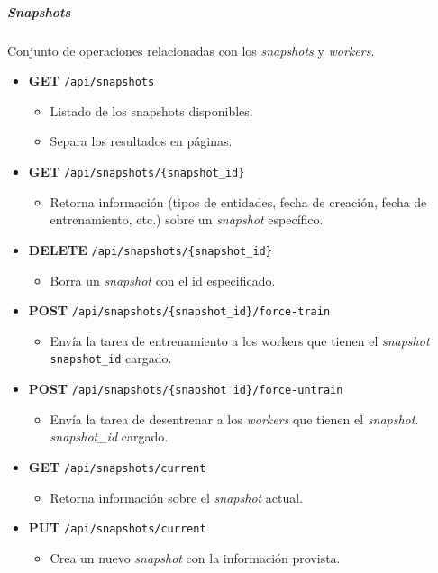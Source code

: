 \documentclass[12pt,a4paper,]{scrartcl}
\providecommand{\tightlist}{%
  \setlength{\itemsep}{0pt}\setlength{\parskip}{0pt}}
\let\oldsubparagraph\subparagraph
\renewcommand{\subparagraph}[1]{\oldsubparagraph{#1}\mbox{}}
\begin{document}
\hypertarget{snapshots-1}{%
\subparagraph{Snapshots}\label{snapshots-1}}

Conjunto de operaciones relacionadas con los \emph{snapshots} y \emph{workers}.

\begin{itemize}
\tightlist
\item
  \textbf{GET} \texttt{/api/snapshots}

  \begin{itemize}
  \tightlist
  \item
    Listado de los snapshots disponibles.
  \item
    Separa los resultados en páginas.
  \end{itemize}
\item
  \textbf{GET} \texttt{/api/snapshots/\{snapshot\_id\}}

  \begin{itemize}
  \tightlist
  \item
    Retorna información (tipos de entidades, fecha de creación, fecha de entrenamiento, etc.) sobre un \emph{snapshot} específico.
  \end{itemize}
\item
  \textbf{DELETE} \texttt{/api/snapshots/\{snapshot\_id\}}

  \begin{itemize}
  \tightlist
  \item
    Borra un \emph{snapshot} con el id especificado.
  \end{itemize}
\item
  \textbf{POST} \texttt{/api/snapshots/\{snapshot\_id\}/force-train}

  \begin{itemize}
  \tightlist
  \item
    Envía la tarea de entrenamiento a los workers que tienen el \emph{snapshot} \texttt{snapshot\_id} cargado.
  \end{itemize}
\item
  \textbf{POST} \texttt{/api/snapshots/\{snapshot\_id\}/force-untrain}

  \begin{itemize}
  \tightlist
  \item
    Envía la tarea de desentrenar a los \emph{workers} que tienen el \emph{snapshot}. \emph{snapshot\_id} cargado.
  \end{itemize}
\item
  \textbf{GET} \texttt{/api/snapshots/current}

  \begin{itemize}
  \tightlist
  \item
    Retorna información sobre el \emph{snapshot} actual.
  \end{itemize}
\item
  \textbf{PUT} \texttt{/api/snapshots/current}

  \begin{itemize}
  \tightlist
  \item
    Crea un nuevo \emph{snapshot} con la información provista.
  \end{itemize}
\end{itemize}
\end{document}
